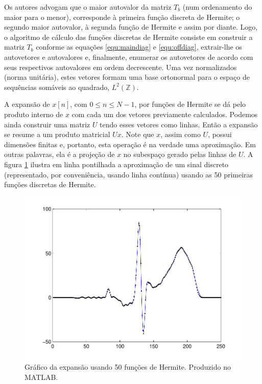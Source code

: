 Os autores advogam que o maior autovalor da matriz $T_b$ (num ordenamento do maior para o menor), corresponde à primeira função discreta de Hermite; o segundo maior autovalor, à segunda função de Hermite e assim por diante. Logo, o algoritmo de cálculo das funções discretas de Hermite consiste em construir a matriz $T_b$ conforme as equações \ref{equ:maindiag} e \ref{equ:offdiag}, extrair-lhe os autovetores e autovalores e, finalmente, enumerar os autovetores de acordo com seus respectivos autovalores em ordem decrescente. Uma vez normalizados (norma unitária), estes vetores formam uma base ortonormal para o espaço de sequências somáveis ao quadrado, $L^2(\mathbb{Z})$.

A expansão de $x[n]$, com $0\leq n\leq N-1$, por funções de Hermite se dá pelo produto interno de $x$ com cada um dos vetores previamente calculados. Podemos ainda construir uma matriz $U$ tendo esses vetores como linhas. Então a expansão se resume a um produto matricial $Ux$. Note que $x$, assim como $U$, possui dimensões finitas e, portanto, esta operação é na verdade uma aproximação. Em outras palavras, ela é a projeção de $x$ no subespaço gerado pelas linhas de $U$. A figura \ref{fig:hermexp} ilustra em linha pontilhada a aproximação de um sinal discreto (representado, por conveniência, usando linha contínua) usando as 50 primeiras funções discretas de Hermite.

\begin{figure}[ht!]
    \centering
    \includegraphics[width=400pt]{figures/chap3-herm-expansion.pdf}
    \caption[Gráfico da expansão usando 50 funções de Hermite]{Gráfico da expansão usando 50 funções de Hermite. Produzido no MATLAB.}
    \label{fig:hermexp}
\end{figure}


